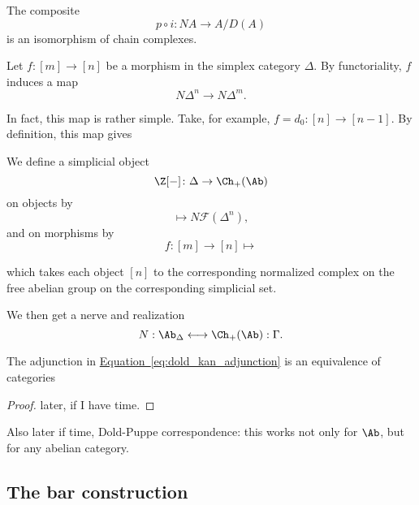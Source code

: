 \documentclass[main.tex]{subfiles}
\begin{document}
\begin{theorem}
  The composite
  \begin{equation*}
    p \circ i\colon NA \to A/D(A)
  \end{equation*}
  is an isomorphism of chain complexes.
\end{theorem}

Let $f\colon [m] \to [n]$ be a morphism in the simplex category $\Delta$. By functoriality, $f$ induces a map
\begin{equation*}
  N \Delta^{n} \to N \Delta^{m}.
\end{equation*}

In fact, this map is rather simple. Take, for example, $f = d_{0}\colon [n] \to [n-1]$. By definition, this map gives


We define a simplicial object
\begin{equation*}
  \Z[-]\colon \Delta \to \Ch_{+}(\Ab)
\end{equation*}
on objects by
\begin{equation*}
  [n] \mapsto N \mathcal{F}(\Delta^{n}),
\end{equation*}
and on morphisms by
\begin{equation*}
  f\colon [m] \to [n] \mapsto
\end{equation*}

which takes each object $[n]$ to the corresponding normalized complex on the free abelian group on the corresponding simplicial set.

We then get a nerve and realization
\begin{equation}
  \label{eq:dold_kan_adjunction}
  N : \Ab_{\Delta} \longleftrightarrow \Ch_{+}(\Ab) : \Gamma.
\end{equation}

\begin{theorem}
  The adjunction in \hyperref[eq:dold_kan_adjunction]{Equation~\ref*{eq:dold_kan_adjunction}} is an equivalence of categories
\end{theorem}
\begin{proof}
  later, if I have time.
\end{proof}

Also later if time, Dold-Puppe correspondence: this works not only for $\Ab$, but for any abelian category.

\subsection{The bar construction}
\label{ssc:the_bar_construction}
\end{document}

